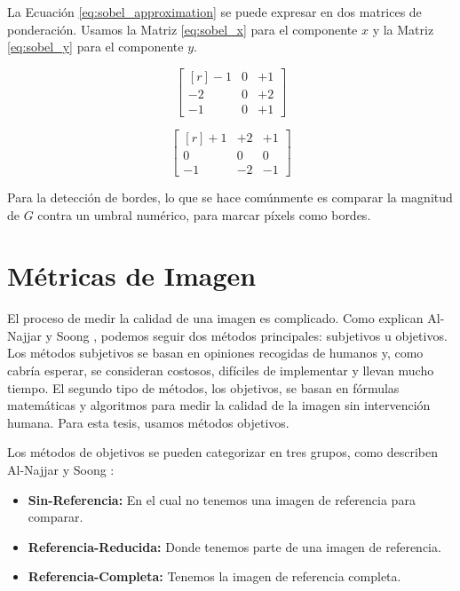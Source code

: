 \documentclass[pregrado]{tesis-usb} %
\begin{document}
La Ecuación \ref{eq:sobel_approximation} se puede expresar en dos matrices de ponderación. Usamos la Matriz \ref{eq:sobel_x} para el componente $x$ y la Matriz \ref{eq:sobel_y} para el componente $y$.

\begin{equation}
\begin{bmatrix*}[r]\label{eq:sobel_x}
-1 &  0 & +1 \\
-2 &  0 & +2 \\
-1 &  0 & +1
\end{bmatrix*}
\end{equation}

\begin{equation}
\begin{bmatrix*}[r]\label{eq:sobel_y}
+1 & +2 & +1 \\
 0 &  0 &  0 \\
-1 & -2 & -1
\end{bmatrix*}
\end{equation}

Para la detección de bordes, lo que se hace comúnmente es comparar la magnitud de $G$ contra un umbral numérico, para marcar píxels como bordes.

\section{Métricas de Imagen}
El proceso de medir la calidad de una imagen es complicado. Como explican Al-Najjar y Soong \cite{Yusra2012}, podemos seguir dos métodos principales: subjetivos u objetivos. Los métodos subjetivos se basan en opiniones recogidas de humanos y, como cabría esperar, se consideran costosos, difíciles de implementar y llevan mucho tiempo. El segundo tipo de métodos, los objetivos, se basan en fórmulas matemáticas y algoritmos para medir la calidad de la imagen sin intervención humana. Para esta tesis, usamos métodos objetivos.

Los métodos de objetivos se pueden categorizar en tres grupos, como describen Al-Najjar y Soong \cite{Yusra2012}:

\begin{itemize}
	\item \textbf{Sin-Referencia:} En el cual no tenemos una imagen de referencia para comparar.
	\item \textbf{Referencia-Reducida:} Donde tenemos parte de una imagen de referencia.
	\item \textbf{Referencia-Completa:} Tenemos la imagen de referencia completa.
\end{itemize}
\end{document}

